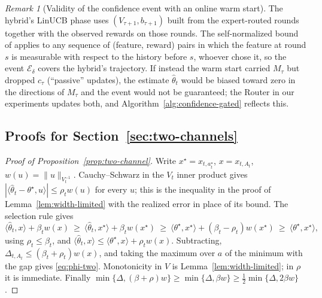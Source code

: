 \documentclass{article}
\theoremstyle{definition}
\theoremstyle{remark}
\newtheorem{remark}{Remark}
\theoremstyle{remark}
\newcommand{\wid}{w}
\begin{document}
\begin{remark}[Validity of the confidence event with an online warm start]
The hybrid's LinUCB phase uses $(V_{\tau+1},b_{\tau+1})$ built from the
expert-routed rounds together with the observed rewards on those rounds. The
self-normalized bound of \cite{abbasi2011improved} applies to any sequence of
(feature, reward) pairs in which the feature at round $s$ is measurable with
respect to the history before $s$, whoever chose it, so the event
$\mathcal E_\delta$ covers the hybrid's trajectory. If instead the warm start
carried $M_\tau$ but dropped $c_\tau$ (``passive'' updates), the estimate
$\widehat\theta_t$ would be biased toward zero in the directions of $M_\tau$
and the event would not be guaranteed; the Router in our experiments updates
both, and Algorithm~\ref{alg:confidence-gated} reflects this.
\end{remark}

\subsection{Proofs for Section~\ref{sec:two-channels}}
\label{app:proof-two-channels}

\begin{proof}[Proof of Proposition~\ref{prop:two-channel}]
Write $x^\star=x_{t,a_t^\star}$, $x=x_{t,A_t}$, $\wid(u)=\|u\|_{V_t^{-1}}$.
Cauchy--Schwarz in the $V_t$ inner product gives
$|\langle\widehat\theta_t-\theta^\star,u\rangle|\le\rho_t\wid(u)$ for every $u$;
this is the inequality in the proof of Lemma~\ref{lem:width-limited} with the
realized error in place of its bound. The selection rule gives
\[
\langle\widehat\theta_t,x\rangle+\beta_t\wid(x)
\ \ge\ \langle\widehat\theta_t,x^\star\rangle+\beta_t\wid(x^\star)
\ \ge\ \langle\theta^\star,x^\star\rangle+(\beta_t-\rho_t)\wid(x^\star)
\ \ge\ \langle\theta^\star,x^\star\rangle,
\]
using $\rho_t\le\beta_t$, and
$\langle\widehat\theta_t,x\rangle\le\langle\theta^\star,x\rangle+\rho_t\wid(x)$.
Subtracting, $\Delta_{t,A_t}\le(\beta_t+\rho_t)\wid(x)$, and taking the maximum
over $a$ of the minimum with the gap gives \eqref{eq:phi-two}. Monotonicity in
$V$ is Lemma~\ref{lem:width-limited}; in $\rho$ it is immediate. Finally
$\min\{\Delta,(\beta+\rho)w\}\ge\min\{\Delta,\beta w\}\ge\tfrac12\min\{\Delta,2\beta w\}$.
\end{proof}
\end{document}
